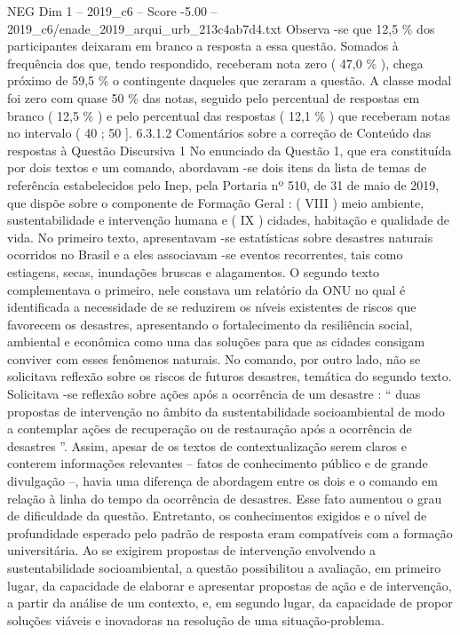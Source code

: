 \begin{textsample}{NEG Dim 1 – 2019\_c6 – Score -5.00 – 2019\_c6/enade\_2019\_arqui\_urb\_213c4ab7d4.txt}
Observa -se que 12,5 \% dos participantes deixaram em branco a resposta a essa questão.
Somados à frequência dos que, tendo respondido, receberam nota zero ( 47,0 \% ), chega próximo de 59,5 \% o contingente daqueles que zeraram a questão.
A classe modal foi zero com quase 50 \% das notas, seguido pelo percentual de respostas em branco ( 12,5 \% ) e pelo percentual das respostas ( 12,1 \% ) que receberam notas no intervalo ( 40 ; 50 ]. 6.3.1.2 Comentários sobre a correção de Conteúdo das respostas à Questão Discursiva 1 No enunciado da Questão 1, que era constituída por dois textos e um comando, abordavam -se dois itens da lista de temas de referência estabelecidos pelo Inep, pela Portaria nº 510, de 31 de maio de 2019, que dispõe sobre o componente de Formação Geral : ( VIII ) meio ambiente, sustentabilidade e intervenção humana e ( IX ) cidades, habitação e qualidade de vida.
No primeiro texto, apresentavam -se estatísticas sobre desastres naturais ocorridos no Brasil e a eles associavam -se eventos recorrentes, tais como estiagens, secas, inundações bruscas e alagamentos.
O segundo texto complementava o primeiro, nele constava um relatório da ONU no qual é identificada a necessidade de se reduzirem os níveis existentes de riscos que favorecem os desastres, apresentando o fortalecimento da resiliência social, ambiental e econômica como uma das soluções para que as cidades consigam conviver com esses fenômenos naturais.
No comando, por outro lado, não se solicitava reflexão sobre os riscos de futuros desastres, temática do segundo texto.
Solicitava -se reflexão sobre ações após a ocorrência de um desastre : “ duas propostas de intervenção no âmbito da sustentabilidade socioambiental de modo a contemplar ações de recuperação ou de restauração após a ocorrência de desastres ”.
Assim, apesar de os textos de contextualização serem claros e conterem informações relevantes – fatos de conhecimento público e de grande divulgação –, havia uma diferença de abordagem entre os dois e o comando em relação à linha do tempo da ocorrência de desastres.
Esse fato aumentou o grau de dificuldade da questão.
Entretanto, os conhecimentos exigidos e o nível de profundidade esperado pelo padrão de resposta eram compatíveis com a formação universitária.
Ao se exigirem propostas de intervenção envolvendo a sustentabilidade socioambiental, a questão possibilitou a avaliação, em primeiro lugar, da capacidade de elaborar e apresentar propostas de ação e de intervenção, a partir da análise de um contexto, e, em segundo lugar, da capacidade de propor soluções viáveis e inovadoras na resolução de uma situação-problema.

\end{textsample}
